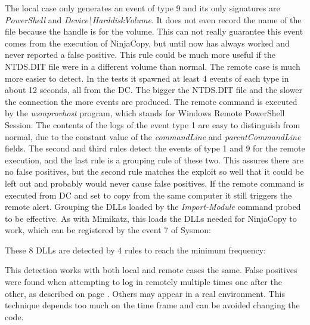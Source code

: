 \linej
The local case only generates an event of type 9 and its only signatures are \textit{PowerShell} and \textit{Device{\textbackslash}HarddiskVolume}. It does not even record the name of the file because the handle is for the volume. This can not really guarantee this event comes from the execution of NinjaCopy, but until now has always worked and never reported a false positive. This rule could be much more useful if the NTDS.DIT file were in a different volume than normal.
\linej
\linej
The remote case is much more easier to detect. In the tests it spawned at least 4 events of each type in about 12 seconds, all from the DC.
The bigger the NTDS.DIT file and the slower the connection the more events are produced.
\linej
The remote command is executed by the \textit{wsmprovhost} program, which stands for Windows Remote PowerShell Session.
The contents of the logs of the event type 1 are easy to distinguish from normal, due to the constant value of the \textit{commandLine} and \textit{parentCommandLine} fields.
\linej
The second and third rules detect the events of type 1 and 9 for the remote execution, and the last rule is a grouping rule of these two. This assures there are no false positives, but the second rule matches the exploit so well that it could be left out and probably would never cause false positives.
\linej
If the remote command is executed from DC and set to copy from the same computer it still triggers the remote alert.
\linej
\linej
Grouping the DLLs loaded by the \textit{Import-Module} command probed to be effective. As with Mimikatz, this loads the DLLs needed for NinjaCopy to work, which can be registered by the event 7 of Sysmon:

\linej
These 8 DLLs are detected by 4 rules to reach the minimum frequency:

\linej
This detection works with both local and remote cases the same.
\linej
False positives were found when attempting to log in remotely multiple times one after the other, as described on page \pageref{reverse_login}.
Others may appear in a real environment.
This technique depends too much on the time frame and can be avoided changing the code.

